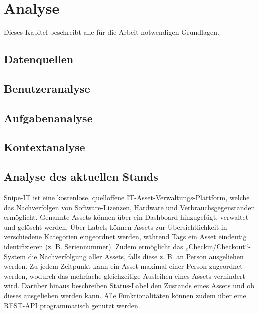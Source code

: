 
\chapter{Analyse}
\label{chapter-analyse}

Dieses Kapitel beschreibt alle für die Arbeit notwendigen Grundlagen.

\section{Datenquellen}
\label{section:daten}

\section{Benutzeranalyse}
\label{section:benutzer}

\section{Aufgabenanalyse}
\label{section:aufgaben}

\section{Kontextanalyse}
\label{section:kontext}

\section{Analyse des aktuellen Stands}
\label{section:iststand}

Snipe-IT ist eine kostenlose, quelloffene IT-Asset-Verwaltungs-Plattform,
welche das Nachverfolgen von Software-Lizenzen, Hardware und
Verbrauchsgegenständen ermöglicht. Genannte Assets können über ein Dashboard
hinzugefügt, verwaltet und gelöscht werden. Über Labels können Assets zur
Übersichtlichkeit in verschiedene Kategorien eingeordnet werden, während
Tags ein Asset eindeutig identifizieren (z. B. Seriennummer). Zudem ermöglicht
das „Checkin/Checkout“-System die Nachverfolgung aller Assets, falls diese
z. B.  an Person ausgeliehen werden. Zu jedem Zeitpunkt kann ein Asset
maximal einer Person zugeordnet werden, wodurch das mehrfache gleichzeitige
Ausleihen eines Assets verhindert wird. Darüber hinaus beschreiben Status-Label
den Zustands eines Assets und ob dieses ausgeliehen werden kann. Alle
Funktionalitäten können zudem über eine REST-API programmatisch genutzt werden.


